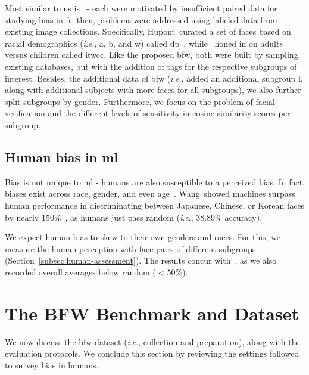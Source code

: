 \documentclass[10pt,twocolumn,letterpaper]{article}
\newcommand{\ie}{\textit{i}.\textit{e}., }
\begin{document}
    
Most similar to us is~\cite{das2018, demogPairs, lopez2019dataset, srinivas2019face} - each were motivated by insufficient paired data for studying bias in \gls{fr}; then, problems were addressed using labeled data from existing image collections. Specifically, Hupont~\etal curated a set of faces based on racial demographics (\ie \gls{a}, \gls{b}, and \gls{w}) called \gls{dp}~\cite{demogPairs}, while~\cite{srinivas2019face} honed in on adults versus children called \gls{itwcc}. Like the proposed \gls{bfw}, both were built by sampling existing databases, but with the addition of tags for the respective subgroups of interest. Besides, the additional data of \gls{bfw} (\ie added an additional subgroup \gls{i}, along with additional subjects with more faces for all subgroups), we also further split subgroups by gender. Furthermore, we focus on the problem of facial verification and the different levels of sensitivity in cosine similarity scores per subgroup.

\subsection{Human bias in \gls{ml}}
Bias is not unique to \gls{ml} - humans are also susceptible to a perceived bias. In fact, biases exist across race, gender, and even age~\cite{10.1007/978-3-030-13469-3_68, bar2006, meissner2001, nicholls2018}. Wang~\etal showed machines surpass human performance in discriminating between Japanese, Chinese, or Korean faces by nearly 150\%~\cite{wang2018they}, as humans just pass random (\ie 38.89\% accuracy).

We expect human bias to skew to their own genders and races. For this, we measure the human perception with face pairs of different subgroups (Section~\ref{subsec:human-assessment}). The results concur with~\cite{wang2018they}, as we also recorded overall averages below random ($<$50\%). %



\section{The BFW Benchmark and Dataset}


We now discuss the \gls{bfw} dataset (\ie collection and preparation), along with the evaluation protocols. We conclude this section by reviewing the settings followed to survey bias in humans.
\end{document}
